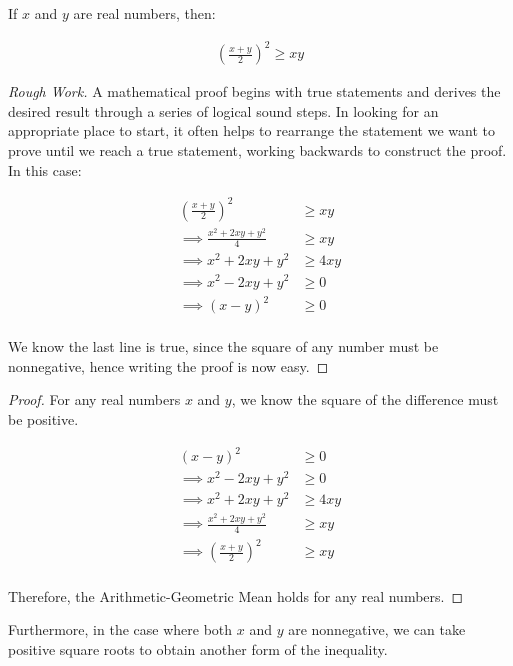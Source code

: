 \documentclass[twoside]{report}
\begin{document}
\begin{theorem} 
	If $x$ and $y$ are real numbers, then:

	\begin{align}
		\left( \frac{x + y}{2} \right)^2 \ge xy
	\end{align}	
\end{theorem}
\begin{proof}[Rough Work]\let\qed\relax
	A mathematical proof begins with true statements and derives the desired result through a series of logical sound steps. In looking for an appropriate place to start, it often helps to rearrange the statement we want to prove until we reach a true statement, working backwards to construct the proof. In this case:
	
	\begin{align*}
		\left( \frac{x + y}{2} \right)^2 &\ge xy \\
		\implies \frac{x^2 + 2xy + y^2}{4} &\ge xy \\
		\implies x^2 + 2xy + y^2 &\ge 4xy \\
		\implies x^2 - 2xy + y^2 &\ge 0 \\
		\implies (x - y)^2 &\ge 0\\
	\end{align*}
	
	We know the last line is true, since the square of any number must be nonnegative, hence writing the proof is now easy.
\end{proof}

\begin{proof}
	For any real numbers $x$ and $y$, we know the square of the difference must be positive.
	
	\begin{align*}
		(x - y)^2 &\ge 0 \\
		\implies x^2 - 2xy + y^2 &\ge 0 \\
		\implies x^2 + 2xy + y^2 &\ge 4xy \\
		\implies \frac{x^2 + 2xy + y^2}{4} &\ge xy \\
		\implies \left( \frac{x + y}{2} \right)^2 &\ge xy \\
	\end{align*}
	
	Therefore, the Arithmetic-Geometric Mean holds for any real numbers.
\end{proof}
\vspace{\baselineskip}

Furthermore, in the case where both $x$ and $y$ are nonnegative, we can take positive square roots to obtain another form of the inequality.
\end{document}
